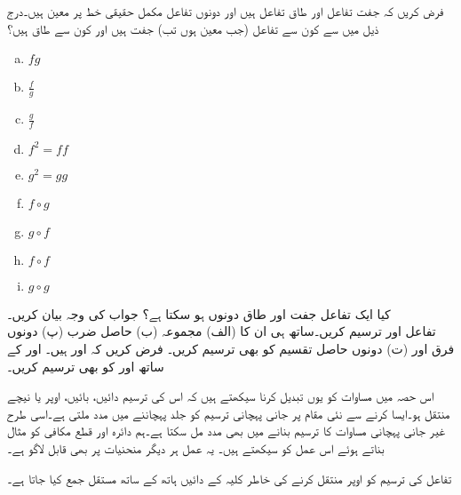 فرض کریں کہ  جفت تفاعل اور  طاق تفاعل ہیں اور دونوں تفاعل مکمل حقیقی خط  پر معین ہیں۔درج ذیل میں سے کون سے تفاعل (جب معین ہوں تب) جفت ہیں اور کون سے طاق ہیں؟
\begin{multicols}{4}
\begin{enumerate}[a.]
\item
$fg$
\item
$\frac{f}{g}$
\item
$\frac{g}{f}$
\item
$f^2=ff$
\item
$g^2=gg$
\item
$f\circ g$
\item
$g\circ f$
\item
$f\circ f$
\item
$g \circ g$
\end{enumerate}
\end{multicols}
کیا ایک تفاعل جفت اور طاق دونوں ہو سکتا ہے؟ جواب کی وجہ بیان کریں۔
\\

تفاعل  اور  ترسیم کریں۔ساتھ ہی ان کا (الف) مجموعہ (ب) حاصل ضرب (پ) دونوں فرق اور (ت) دونوں حاصل تقسیم کو بھی ترسیم کریں۔
فرض کریں کہ  اور  ہیں۔ اور  کے ساتھ  اور  کو بھی ترسیم کریں۔

اس حصہ میں مساوات کو یوں تبدیل کرنا سیکھتے ہیں کہ اس کی ترسیم دائیں، بائیں، اوپر یا نیچے منتقل ہو۔ایسا کرنے سے  نئی مقام پر جانی پہچانی ترسیم کو جلد پہچاننے میں مدد ملتی ہے۔اسی طرح غیر جانی پہچانی مساوات کا ترسیم بنانے میں بھی مدد مل سکتا ہے۔ہم دائرہ اور قطع مکافی کو مثال بناتے ہوئے اس عمل کو سیکھتے ہیں۔ یہ عمل ہر دیگر منحنیات پر بھی قابل لاگو ہے۔

تفاعل  کی ترسیم کو اوپر منتقل کرنے کی خاطر کلیہ  کے دائیں ہاتھ کے ساتھ مستقل جمع کیا جاتا ہے۔ 

